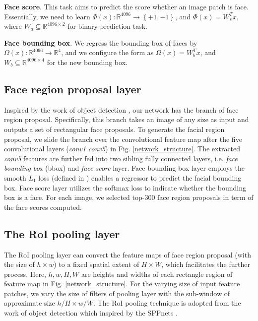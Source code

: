 \documentclass[10pt,twocolumn,letterpaper]{article}
\begin{document}
\noindent \textbf{Face score}. This task aims to predict the score
whether an image patch is face. Essentially, we need to learn $\Phi\left(x\right):\mathbb{R}^{4096}\rightarrow\left\{ +1,-1\right\} $,
and $\Phi\left(x\right)=W_{s}^{T}x$, where $W_{a}\subseteq\mathbb{R}^{4096\times2}$
for binary prediction task.

\vspace{0.05in}

\noindent \textbf{Face bounding box}. We regress the bounding box
of faces by $\Omega\left(x\right):\mathbb{R}^{4096}\rightarrow\mathbb{R}^{4}$,
and we configure the form as $\Omega\left(x\right)=W_{b}^{T}x$, and
$W_{b}\subseteq\mathbb{R}^{4096\times4}$ for the new bounding box.

\subsection{Face region proposal layer \label{subsec:Face-Region-proposal}}

Inspired by the work of object detection \cite{faster_rcnn}, our
network has the branch of face region proposal. Specifically, this
branch takes an image of any size as input and outputs a set of rectangular
face proposals. To generate the facial region proposal, we slide the
branch over the convolutional feature map after the five convolutional
layers (\emph{conv1}\textendash{} \emph{conv5}) in Fig. \ref{network_structure}.
The extracted \emph{conv5} features are further fed into two sibling
fully connected layers, i.e. \emph{face bounding box} (bbox) and \emph{face
score} layer. Face bounding box layer employs the smooth $L_{1}$
loss (defined in \cite{fast_rcnn}) enables a regressor to predict
the facial bounding box. Face score layer utilizes the softmax loss
to indicate whether the bounding box is a face. For each image, we
selected top-300 face region proposals in term of the face scores
computed.

\subsection{The RoI pooling layer\label{subsec:The-RoI-pooling}}
The RoI pooling layer can convert the feature maps of face region
proposal (with the size of $h\times w$) to a fixed spatial extent
of $H\times W$, which facilitates the further process. Here, $h,w,H,W$
are heights and widths of each rectangle region of feature map in
Fig. \ref{network_structure}. For the varying size of input feature patches,
we vary the size of filters of pooling layer with the sub-window of
approximate size $h/H\times w/W$. The RoI pooling technique is 
 adopted from the work of object detection \cite{fast_rcnn} which inspired by the SPPnets \cite{he2014spatial}.
\end{document}
